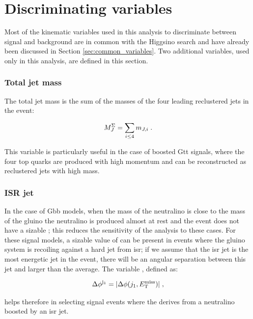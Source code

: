\section{Discriminating variables}
\label{sec:strong:sigbkg}

Most of the kinematic variables used in this analysis to discriminate between signal and background 
are in common with the Higgsino search and have already been discussed in Section \ref{sec:common_variables}.
Two additional variables, used only in this analysis, are defined in this section.

\subsubsection*{Total jet mass}

The total jet mass is the sum of the masses of the four leading reclustered jets in the event:

\begin{equation}
M_{J}^{\Sigma} = \sum_{i \leq 4} m_{J,i} \; .
\end{equation}

\noindent This variable is particularly useful in the case of boosted Gtt signals, where the four top quarks are produced with high momentum and can be reconstructed as reclustered jets with high mass. 

\subsubsection*{ISR jet}

In the case of Gbb models, when the mass of the neutralino is close to the mass of the gluino the neutralino is produced almost at rest and the event does not have a sizable \met; this reduces the sensitivity of the analysis to these cases. 
For these signal models, a sizable value of \met can be present in events where the gluino system is recoiling against a hard jet from \gls{isr}; if we assume that the \gls{isr} jet is the most energetic jet in the event, there will be an angular separation between this jet and \met larger than the average. The variable \dphilead, defined as:

\begin{equation}
{\Delta}\phi^{\mathrm{j}_1} = |{\Delta}{\phi}(j_1, E_{\rm T}^{\mathrm{miss}})| \; ,
\end{equation}

\noindent helps therefore in selecting signal events where the \met derives from a neutralino boosted by an \gls{isr} jet. 


